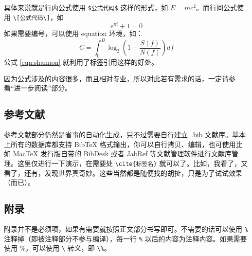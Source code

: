 具体来说就是行内公式使用 \verb|$公式代码$| 这样的形式，如 $E=mc^2$。而行间公式使用 \verb|\[公式代码\]|，如
\[e^{\pi i}+1=0\]
如果需要编号，可以使用 equation 环境，如：
\begin{equation}
	C=\int^B_0\log_2(1+\frac{S(f)}{N(f)})df
	\label{eqn:shannon}
\end{equation}
公式 \eqref{eqn:shannon} 就利用了标签引用这样的好处。

因为公式涉及的内容很多，而且相对专业，所以对此若有需求的话，一定请参看“进一步阅读”部分。

\subsection{参考文献}
参考文献部分仍然是省事的自动化生成，只不过需要自行建立~.bib 文献库。基本上所有的数据库都支持 BibTeX 格式输出，你可以自行拷贝、编辑，也可使用比如 MacTeX 发行版自带的 BibDesk 或者 JabRef 等文献管理软件进行文献库管理。这里仅进行一下演示，在需要处 \verb|\cite{标签名}| 就可以了。比如，我看了\cite{ref1}，又看了\cite{ref2}，还有\cite{ref3,ref4}，发现世界真奇妙\cite{ref3}。这些当然都是随便找的胡扯，只是为了试试效果（而已）。

\subsection{附录}
附录并不是必须项，如果有需要就按照正文部分书写即可。不需要的话可以使用 \verb|%| 注释掉（即被注释部分不参与编译），每一行 \verb|%| 以后的内容为注释内容。如果需要使用 \%，可以使用 \verb|\| 转义，即 \verb|\%|。
